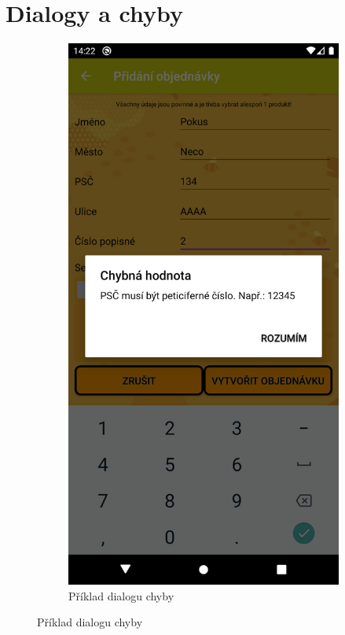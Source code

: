 \documentclass[12pt]{report}
\begin{document}
\section{Dialogy a chyby}
\begin{figure}[H]
	\centering
	\begin{subfigure}{.45\textwidth}
	  \centering
	  \includegraphics[width=.9\textwidth]{img/error_dialog.png}
	  \caption{Příklad dialogu chyby}
	  \label{fig:dialog_error}
	\end{subfigure}

\end{figure}
\end{document}
